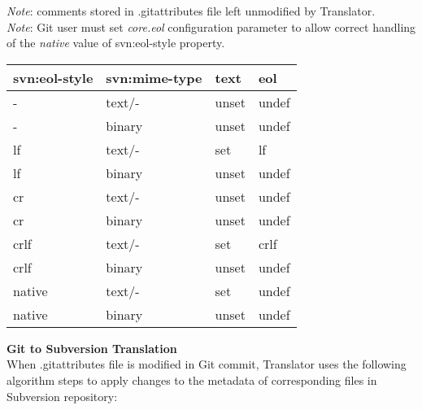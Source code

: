 \emph{Note}: comments stored in .gitattributes file left unmodified by Translator.\\
\emph{Note}: Git user must set \emph{core.eol} configuration parameter to allow correct handling of the \emph{native} value of svn:eol-style property.

\begin{center}
\begin{tabular}{ | p{} | p{} | p{} | p{} |}
	\hline
	svn:eol-style &   svn:mime-type &   text  & eol \\ \hline \hline
	-             &   text/-        &   unset & undef \footnotemark[1] \footnotemark[2] \\ \hline
	-             &   binary        &   unset & undef \\ \hline
	lf            &   text/-        &   set   & lf \\ \hline
	lf            &   binary        &   unset & undef \\ \hline
	cr            &   text/-        &   unset & undef  \footnotemark[3] \\ \hline
	cr            &   binary        &   unset & undef \\ \hline
	crlf          &   text/-        &   set   & crlf \\ \hline
	crlf          &   binary        &   unset & undef \\ \hline
	native        &   text/-        &   set   & undef \footnotemark[4] \\ \hline
	native        &   binary        &   unset & undef \\ \hline
\end{tabular}
\label{eol_mime_svn_to_git}
\end{center}
\newpage
\textbf{Git to Subversion Translation}\\

When .gitattributes file is modified in Git commit, Translator uses the following algorithm steps to apply changes to the metadata of corresponding files in Subversion repository:

